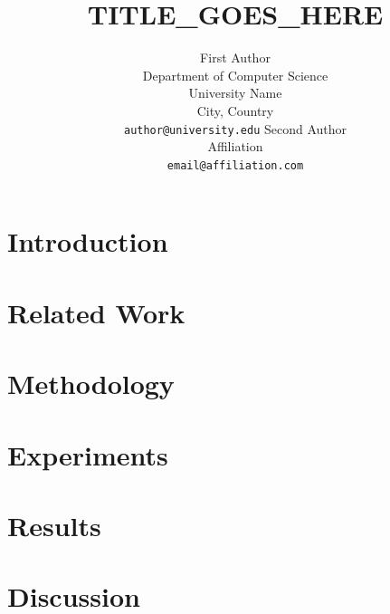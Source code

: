 \documentclass{article}
\title{TITLE_GOES_HERE}
\author{%
  First Author \\
  Department of Computer Science \\
  University Name \\
  City, Country \\
  \texttt{author@university.edu}
  \And
  Second Author \\
  Affiliation \\
  \texttt{email@affiliation.com}
}
\begin{document}
\maketitle

\begin{abstract}
\end{abstract}

\section{Introduction}

\section{Related Work}

\section{Methodology}

\section{Experiments}

\section{Results}

\section{Discussion}
\end{document}
